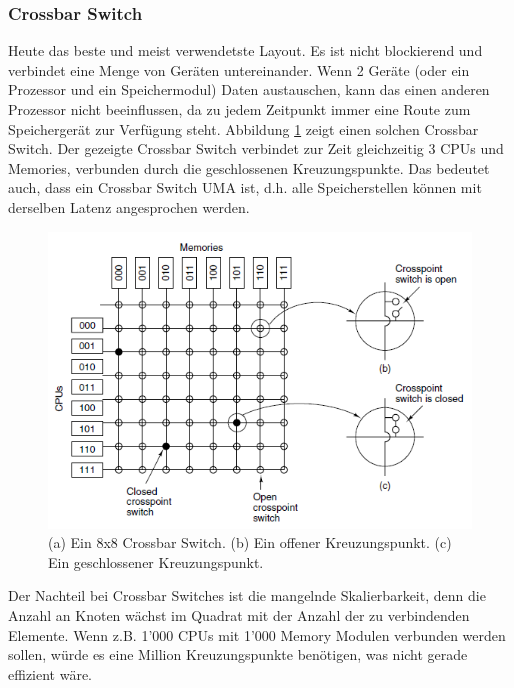 \subsubsection{Crossbar Switch}
Heute das beste und meist verwendetste Layout. Es ist nicht blockierend und verbindet eine Menge von Geräten untereinander. Wenn 2 Geräte (oder ein Prozessor und ein Speichermodul) Daten austauschen, kann das einen anderen Prozessor nicht beeinflussen, da zu jedem Zeitpunkt immer eine Route zum Speichergerät zur Verfügung steht. Abbildung \ref{fig:crossbar_switch} zeigt einen solchen Crossbar Switch. Der gezeigte Crossbar Switch verbindet zur Zeit gleichzeitig 3 CPUs und Memories, verbunden durch die geschlossenen Kreuzungspunkte. Das bedeutet auch, dass ein Crossbar Switch UMA ist, d.h. alle Speicherstellen können mit derselben Latenz angesprochen werden.
\begin{figure}[h!]
\centering
\includegraphics[width=0.5\linewidth]{fig/crossbar_switch}
\caption{(a) Ein 8x8 Crossbar Switch. (b) Ein offener Kreuzungspunkt. (c) Ein geschlossener Kreuzungspunkt.}
\label{fig:crossbar_switch}
\end{figure}

Der Nachteil bei Crossbar Switches ist die mangelnde Skalierbarkeit, denn die Anzahl an Knoten wächst im Quadrat mit der Anzahl der zu verbindenden Elemente. Wenn z.B. 1'000 CPUs mit 1'000 Memory Modulen verbunden werden sollen, würde es eine Million Kreuzungspunkte benötigen, was nicht gerade effizient wäre.

\newpage

